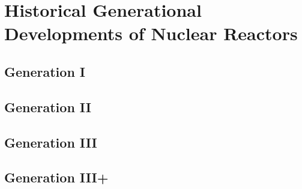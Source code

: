 \chapter{Historical Generational Developments of Nuclear Reactors}
\section{Generation I}
\section{Generation II}
\section{Generation III}
\section{Generation III+}